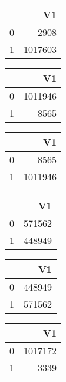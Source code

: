 \bigskip\bigskip
\centering
\begin{tabular}{rr}
  \hline
 & V1 \\ 
  \hline
0 & 2908 \\ 
  1 & 1017603 \\ 
   \hline
\end{tabular}

\bigskip\bigskip
\centering
\begin{tabular}{rr}
  \hline
 & V1 \\ 
  \hline
0 & 1011946 \\ 
  1 & 8565 \\ 
   \hline
\end{tabular}

\bigskip\bigskip
\centering
\begin{tabular}{rr}
  \hline
 & V1 \\ 
  \hline
0 & 8565 \\ 
  1 & 1011946 \\ 
   \hline
\end{tabular}

\bigskip\bigskip
\centering
\begin{tabular}{rr}
  \hline
 & V1 \\ 
  \hline
0 & 571562 \\ 
  1 & 448949 \\ 
   \hline
\end{tabular}

\bigskip\bigskip
\centering
\begin{tabular}{rr}
  \hline
 & V1 \\ 
  \hline
0 & 448949 \\ 
  1 & 571562 \\ 
   \hline
\end{tabular}

\bigskip\bigskip
\centering
\begin{tabular}{rr}
  \hline
 & V1 \\ 
  \hline
0 & 1017172 \\ 
  1 & 3339 \\ 
   \hline
\end{tabular}

